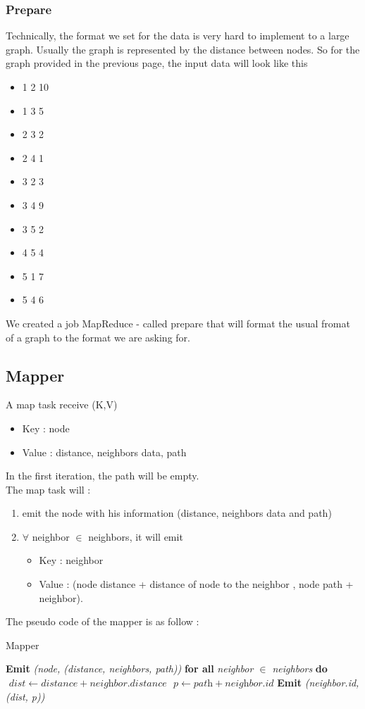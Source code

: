 \documentclass[english]{article}
\begin{document}
\subsubsection{Prepare}
Technically, the format we set for the data is very hard to implement to a large graph. Usually the graph is represented by the distance between nodes. So for the graph provided in the previous page, the input data will look like this 
\begin{itemize}
\item 1 2 10
\item 1 3 5
\item 2 3 2
\item 2 4 1
\item 3 2 3
\item 3 4 9
\item 3 5 2
\item 4 5 4
\item 5 1 7
\item 5 4 6
\end{itemize}
We created a job MapReduce - called prepare that will format the usual fromat of a graph to the format we are asking for.

\subsection{Mapper}
A map task receive (K,V)
\begin{itemize}
\item Key : node
\item Value : distance, neighbors data, path
\end{itemize}
In the first iteration, the path will be empty. \\
The map task will : 
\begin{enumerate}
\item emit the node with his information (distance, neighbors data and path)
\item  $\forall$ neighbor $\in$ neighbors, it will emit 
	\begin{itemize}
	\item Key : neighbor
	\item Value : (node distance + distance of node to the neighbor , node path + neighbor).
	\end{itemize}
\end{enumerate}

The pseudo code of the mapper is as follow : 
\begin{algorithm}[h]
\caption{Mapper}\label{mapper}
\begin{algorithmic}[1]
\State \textbf{Emit} \emph{(node, (distance, neighbors, path))}
\State \textbf{for all} \emph{ neighbor $ \in$ neighbors } \textbf{do}
\State $\textit{ dist} \gets \textit{distance} + \textit{neighbor.distance} $
\State $ \textit{ p} \gets \textit{path} + \textit{neighbor.id} $
\State \textbf{ Emit} \emph{(neighbor.id, (dist, p))}
\EndProcedure
\end{algorithmic}
\end{algorithm}
\end{document}
